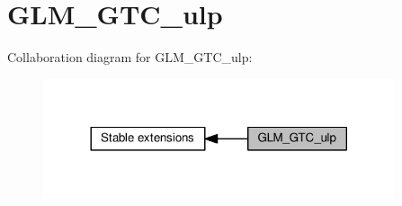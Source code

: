 \hypertarget{group__gtc__ulp}{}\section{G\+L\+M\+\_\+\+G\+T\+C\+\_\+ulp}
\label{group__gtc__ulp}
Collaboration diagram for G\+L\+M\+\_\+\+G\+T\+C\+\_\+ulp\+:
\nopagebreak
\begin{figure}[H]
\begin{center}
\leavevmode
\includegraphics[width=293pt]{d2/d02/group__gtc__ulp}
\end{center}
\end{figure}

